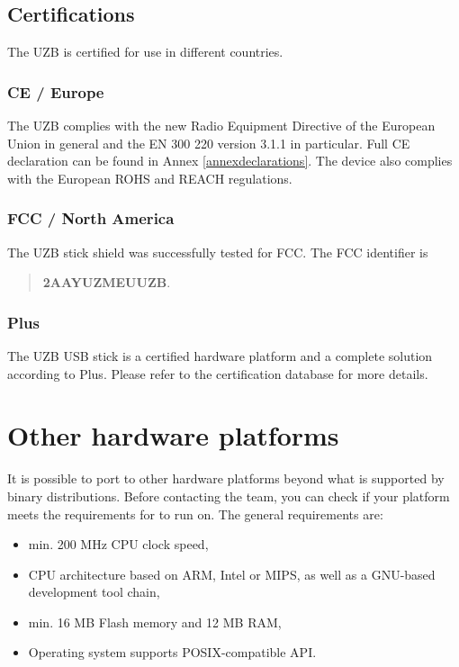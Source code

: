 \subsection{Certifications}

The UZB is certified for use in different countries.

\subsubsection {CE / Europe}

The UZB complies with the new Radio Equipment Directive of the European Union in general 
and the EN 300 220 version 3.1.1 in particular. Full CE declaration can be found in
Annex \ref{annexdeclarations}.
The device also complies with the European ROHS and REACH regulations.

\subsubsection {FCC / North America}

The UZB stick shield was successfully tested for FCC. The FCC identifier is

\begin{quote}
\textbf{2AAYUZMEUUZB}.
\end{quote}

\subsubsection {\zwave Plus}

The UZB USB stick is a certified hardware platform and a complete solution according to 
\zwave Plus. Please refer to the certification database 
 for more details.

\section {Other hardware platforms}
\label{otherhardware}

It is possible to port \zway to other hardware platforms beyond what is supported by 
binary distributions. Before contacting the \zwaveme team, you can check if your platform 
meets the requirements for \zway to run on. The general requirements are:
\begin{itemize}
\item min. 200 MHz CPU clock speed,
\item CPU architecture based on ARM, Intel or MIPS, as well as a GNU-based development tool chain,
\item min. 16 MB Flash memory and 12 MB RAM,
\item Operating system supports POSIX-compatible API.
\end{itemize}

